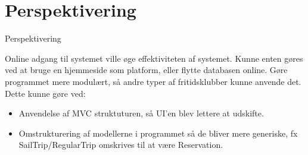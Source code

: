 \section{Perspektivering}

\begin{frame}{Perspektivering}

Online adgang til systemet ville øge effektiviteten af systemet. Kunne enten gøres ved at bruge en hjemmeside som platform, eller flytte databasen online.
\newline Gøre programmet mere modulært, så andre typer af fritidsklubber kunne anvende det.
Dette kunne gøre ved:
\begin{itemize}
 \item Anvendelse af MVC struktuturen, så UI'en blev lettere at udskifte.
 \item Omstrukturering af modellerne i programmet så de bliver mere generiske, fx SailTrip/RegularTrip omskrives til at være Reservation.
\end{itemize}
\end{frame}